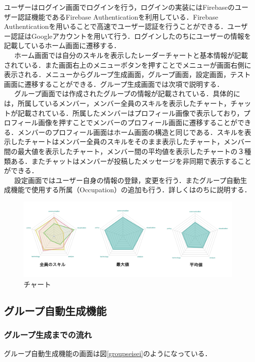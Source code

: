 \documentclass{funthesis}
\begin{document}
ユーザーはログイン画面でログインを行う，ログインの実装にはFirebaseのユーザー認証機能であるFirebase Authenticationを利用している．Firebase Authenticationを用いることで高速でユーザー認証を行うことができる．ユーザー認証はGoogleアカウントを用いて行う．ログインしたのちにユーザーの情報を記載しているホーム画面に遷移する．\\
\ \ \ ホーム画面では自分のスキルを表示したレーダーチャートと基本情報が記載されている．また画面右上のメニューボタンを押すことでメニューが画面右側に表示される．メニューからグループ生成画面，グループ画面，設定画面，テスト画面に遷移することができる．グループ生成画面では次項で説明する．\\
\ \ \ グループ画面では作成されたグループの情報が記載されている．具体的には，所属しているメンバー，メンバー全員のスキルを表示したチャート，チャットが記載されている．所属したメンバーはプロフィール画像で表示しており，プロフィール画像を押すことでメンバーのプロフィール画面に遷移することができる．メンバーのプロフィール画面はホーム画面の構造と同じである．スキルを表示したチャートはメンバー全員のスキルをそのまま表示したチャート，メンバー間の最大値を表示したチャート，メンバー間の平均値を表示したチャートの３種類ある．またチャットはメンバーが投稿したメッセージを非同期で表示することができる．\\
\ \ \ 設定画面ではユーザー自身の情報の登録，変更を行う．またグループ自動生成機能で使用する所属（Occupation）の追加も行う．詳しくはのちに説明する．



\begin{figure}[H]
 \centering
   \includegraphics[width=150mm]{figures/chart.png}
 \caption{チャート}
 \label{chart}
\end{figure}


\subsection{グループ自動生成機能}
\subsubsection{グループ生成までの流れ}
グループ自動生成機能の画面は図\ref{groupseisei}のようになっている．
\end{document}
